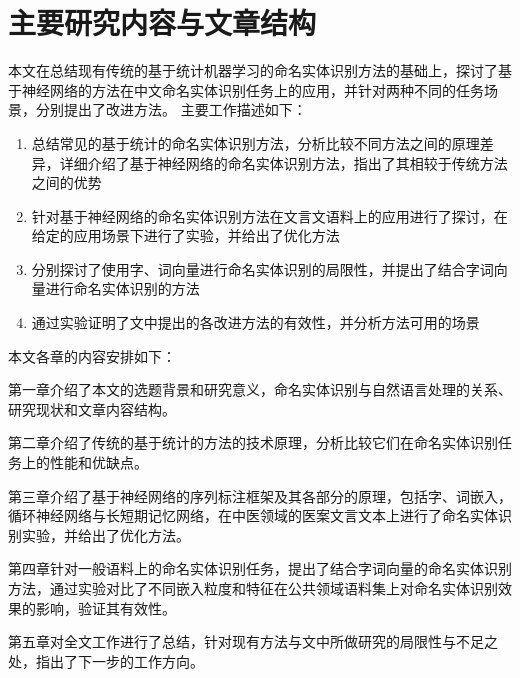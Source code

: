 \section{主要研究内容与文章结构}
本文在总结现有传统的基于统计机器学习的命名实体识别方法的基础上，探讨了基于神经网络的方法在中文命名实体识别任务上的应用，并针对两种不同的任务场景，分别提出了改进方法。
主要工作描述如下：
\begin{enumerate}[\indent(1)]
    \item 总结常见的基于统计的命名实体识别方法，分析比较不同方法之间的原理差异，详细介绍了基于神经网络的命名实体识别方法，指出了其相较于传统方法之间的优势
    \item 针对基于神经网络的命名实体识别方法在文言文语料上的应用进行了探讨，在给定的应用场景下进行了实验，并给出了优化方法
    \item 分别探讨了使用字、词向量进行命名实体识别的局限性，并提出了结合字词向量进行命名实体识别的方法
    \item 通过实验证明了文中提出的各改进方法的有效性，并分析方法可用的场景
\end{enumerate}

本文各章的内容安排如下：

第一章介绍了本文的选题背景和研究意义，命名实体识别与自然语言处理的关系、研究现状和文章内容结构。

第二章介绍了传统的基于统计的方法的技术原理，分析比较它们在命名实体识别任务上的性能和优缺点。

第三章介绍了基于神经网络的序列标注框架及其各部分的原理，包括字、词嵌入，循环神经网络与长短期记忆网络，在中医领域的医案文言文本上进行了命名实体识别实验，并给出了优化方法。

第四章针对一般语料上的命名实体识别任务，提出了结合字词向量的命名实体识别方法，通过实验对比了不同嵌入粒度和特征在公共领域语料集上对命名实体识别效果的影响，验证其有效性。

第五章对全文工作进行了总结，针对现有方法与文中所做研究的局限性与不足之处，指出了下一步的工作方向。
